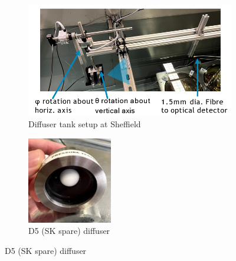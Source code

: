 \begin{figure}
    \centering
     \begin{subfigure}[b]{0.9\linewidth}
      \includegraphics[width=\linewidth]{Figures/diffuser_tank_sheff.PNG}
      \caption{Diffuser tank setup at Sheffield}
      \label{fig:diffuser_tank_sheff} 
     \end{subfigure}
     \begin{subfigure}[b]{0.3\linewidth}
       \includegraphics[width=\linewidth]{Figures/D5_diffuser.PNG}
        \caption{D5 (SK spare) diffuser} 
     \label{fig:D5_diffuser}
      \end{subfigure} \hfill%

\end{figure}
